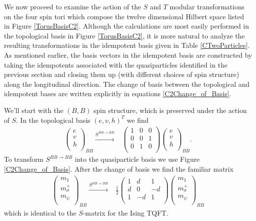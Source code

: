 \documentclass[12pt,a4paper]{article}
\newcounter{arrow}
\newcommand{\unit}{\mathds{1}}
\begin{document}
We now proceed to examine the action of the $S$ and $T$ modular transformations on the four spin tori which compose 
the twelve dimensional Hilbert space listed in Figure \ref{TorusBasisC2}.
Although the calculations are most easily performed in the topological basis in Figure \ref{TorusBasisC2}, 
it is more natural to analyze the resulting transformations in the idempotent basis given in Table \ref{CTwoParticles}. 
As mentioned earlier, the basis vectors in the idempotent basis are constructed by taking the idempotents associated with the 
quasiparticles identified in the previous section and closing them up (with different choices of spin structure) 
along the longitudinal direction. 
The change of basis between the topological and idempotent bases are written explicitly in equations \eqref{C2Change_of_Basis}. 


We'll start with the $(B,B)$ spin structure, which is preserved under the action of $S$. 
In the topological basis $(e,v,h)^T$ we find
\begin{align}
\left( \begin{matrix}
e\\
v\\
h\\
\end{matrix} \right)_{BB} 
\xrightarrow{S^{BB \rightarrow BB}} & \left( \begin{matrix}
1&0&0\\
0&0&1\\
0&1&0\\
\end{matrix} \right)
\left( \begin{matrix}
e\\
v\\
h\\
\end{matrix} \right)_{BB}.
\end{align}
To transform $S^{BB\rightarrow BB}$ into the quasiparticle basis we use Figure \ref{C2Change_of_Basis}.
After the change of basis we find the familiar matrix
\begin{align}
\left( \begin{matrix}
m_\unit\\
m_\sigma^+\\
m_\psi \\
\end{matrix} \right)_{BB} 
\xrightarrow{S^{BB \rightarrow BB}} &\frac{1}{2} \left( \begin{matrix}
1&d&1\\
d&0&-d\\
1&-d&1\\
\end{matrix} \right)
\left( \begin{matrix}
m_\unit\\
m_\sigma^+\\
m_\psi \\
\end{matrix} \right)_{BB}
\end{align}
which is identical to the $S$-matrix for the Ising TQFT. 
\end{document}
